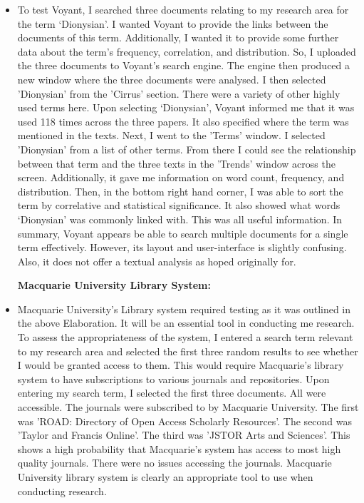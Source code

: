 \documentclass[a4paper,12pt]{article}
\begin{document}
\begin{itemize}
\item To test Voyant, I searched three documents relating to my research area for the term ‘Dionysian’. I wanted Voyant to provide the links between the documents of this term. Additionally, I wanted it to provide some further data about the term’s frequency, correlation, and distribution. So, I uploaded the three documents to Voyant's search engine. The engine then produced a new window where the three documents were analysed. I then selected 'Dionysian' from the 'Cirrus' section. There were a variety of other highly used terms here. Upon selecting ‘Dionysian’, Voyant informed me that it was used 118 times across the three papers. It also specified where the term was mentioned in the texts. Next, I went to the 'Terms' window. I selected 'Dionysian' from a list of other terms. From there I could see the relationship between that term and the three texts in the 'Trends' window across the screen. Additionally, it gave me information on word count, frequency, and distribution. Then, in the bottom right hand corner, I was able to sort the term by correlative and statistical significance. It also showed what words ‘Dionysian’ was commonly linked with. This was all useful information. In summary, Voyant appears be able to search multiple documents for a single term effectively. However, its layout and user-interface is slightly confusing. Also, it does not offer a textual analysis as hoped originally for. 

\textbf {Macquarie University Library System:} 

\item Macquarie University’s Library system required testing as it was outlined in the above Elaboration. It will be an essential tool in conducting me research. To assess the appropriateness of the system, I entered a search term relevant to my research area and selected the first three random results to see whether I would be granted access to them. This would require Macquarie’s library system to have subscriptions to various journals and repositories. Upon entering my search term, I selected the first three documents. All were accessible. The journals were subscribed to by Macquarie University. The first was 'ROAD: Directory of Open Access Scholarly Resources'. The second was 'Taylor and Francis Online'. The third was 'JSTOR Arts and Sciences'. This shows a high probability that Macquarie's system has access to most high quality journals. There were no issues accessing the journals. Macquarie University library system is clearly an appropriate tool to use when conducting research. 


\end{itemize}
\end{document}
